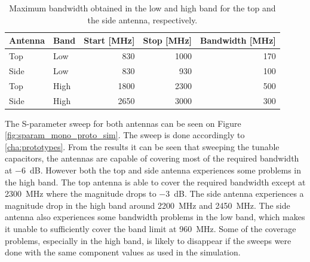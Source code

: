     \begin{table}
      \centering
      \begin{tabular}{|l|l|r|r|r|}
        \hline
        Antenna & Band & Start [MHz] & Stop [MHz] & Bandwidth [MHz] \\
        \hline
        Top     & Low  & 830        & 1000       & 170 \\
        Side    & Low  & 830         & 930        & 100 \\
        \hline
        Top     & High & 1800        & 2300       & 500 \\
        Side    & High & 2650        & 3000       & 300 \\
        \hline
      \end{tabular}
      \caption{Maximum bandwidth obtained in the low and high band for the top and the side antenna, respectively.}
      \label{tab:bw_sol1_proto}
    \end{table}

The S-parameter sweep for both antennas can be seen on Figure \ref{fig:sparam_mono_proto_sim}. The sweep is done accordingly to \ref{cha:prototypes}. From the results it can be seen that sweeping the tunable capacitors, the antennas are capable of covering most of the required bandwidth at \SI{-6}{dB}. However both the top and side antenna experiences some problems in the high band. The top antenna is able to cover the required bandwidth except at \SI{2300}{MHz} where the magnitude drops to \SI{-3}{dB}. The side antenna experiences a magnitude drop in the high band around \SI{2200}{MHz} and \SI{2450}{MHz}. The side antenna also experiences some bandwidth problems in the low band, which makes it unable to sufficiently cover the band limit at \SI{960}{MHz}. Some of the coverage problems, especially in the high band, is likely to disappear if the sweeps were done with the same component values as used in the simulation.   

